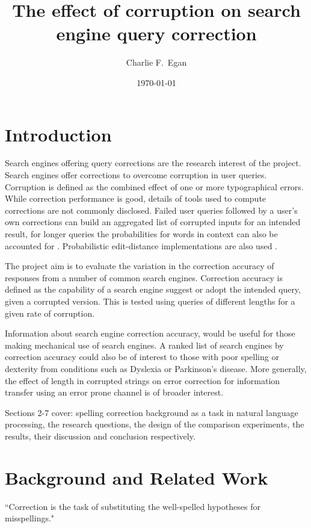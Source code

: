 \documentclass{csfourzero}
\title{The effect of corruption on search engine query correction}
\author{Charlie F.\ Egan}
\date{\today}
\begin{document}
\maketitle

\section{Introduction}
\label{sec:intro}

Search engines offering query corrections are the research interest of the project. Search engines offer corrections to overcome corruption in user queries. Corruption is defined as the combined effect of one or more typographical errors. While correction performance is good, details of tools used to compute corrections are not commonly disclosed. Failed user queries followed by a user's own corrections can build an aggregated list of corrupted inputs for an intended result, for longer queries the probabilities for words in context can also be accounted for \cite{noampatent}. Probabilistic edit-distance implementations are also used \cite{howtospellcorrector}.

The project aim is to evaluate the variation in the correction accuracy of responses from a number of common search engines. Correction accuracy is defined as the capability of a search engine suggest or adopt the intended query, given a corrupted version. This is tested using queries of different lengths for a given rate of corruption.

Information about search engine correction accuracy, would be useful for those making mechanical use of search engines. A ranked list of search engines by correction accuracy could also be of interest to those with poor spelling or dexterity from conditions such as Dyslexia or Parkinson's disease. More generally, the effect of length in corrupted strings on error correction for information transfer using an error prone channel is of broader interest.

Sections 2-7 cover: spelling correction background as a task in natural language processing, the research questions, the design of the comparison experiments, the results, their discussion and conclusion respectively.

\section{Background and Related Work}
\label{sec:lit}

``Correction is the task of substituting the well-spelled hypotheses for misspellings." \cite{webuser4google2009}
\end{document}
